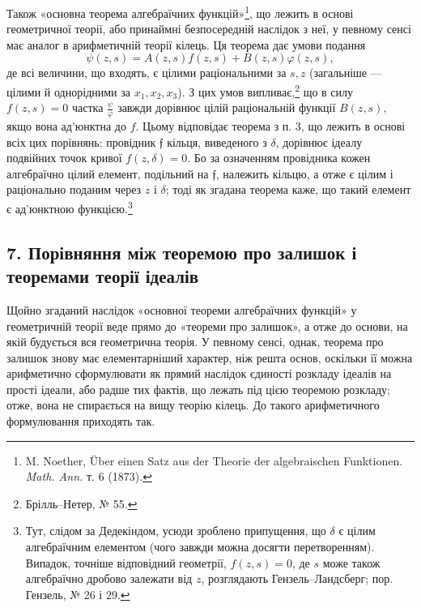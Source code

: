 \documentclass[11pt]{article}
\providecommand{\frf}{\mathfrak f}
\begin{document}
Також «основна теорема алгебраїчних функцій»\footnote{M. Noether, Über einen Satz aus der Theorie der algebraischen Funktionen. \emph{Math. Ann.} т. 6 (1873).}, що лежить в основі геометричної теорії, або принаймні безпосередній наслідок з неї, у певному сенсі має аналог в арифметичній теорії кілець. Ця теорема дає умови подання
\[
\psi(z,s)=A(z,s)f(z,s)+B(z,s)\varphi(z,s),
\]
де всі величини, що входять, є цілими раціональними за \(s,z\) (загальніше --- цілими й однорідними за \(x_1,x_2,x_3\)). З цих умов випливає,\footnote{Брілль--Нетер, № 55.} що в силу \(f(z,s)=0\) частка \(\frac{\psi}{\varphi}\) завжди дорівнює цілій раціональній функції \(B(z,s)\), якщо вона ад'юнктна до \(f\). Цьому відповідає теорема з п. 3, що лежить в основі всіх цих порівнянь: провідник \(\frf\) кільця, виведеного з \(\delta\), дорівнює ідеалу подвійних точок кривої \(f(z,\delta)=0\). Бо за означенням провідника кожен алгебраїчно цілий елемент, подільний на \(\frf\), належить кільцю, а отже є цілим і раціонально поданим через \(z\) і \(\delta\); тоді як згадана теорема каже, що такий елемент є ад'юнктною функцією.\footnote{Тут, слідом за Дедекіндом, усюди зроблено припущення, що \(\delta\) є цілим алгебраїчним елементом (чого завжди можна досягти перетворенням). Випадок, точніше відповідний геометрії, \(f(z,s)=0\), де \(s\) може також алгебраїчно дробово залежати від \(z\), розглядають Гензель--Ландсберг; пор. Гензель, № 26 і 29.}

\subsection*{7. Порівняння між теоремою про залишок і теоремами теорії ідеалів}
Щойно згаданий наслідок «основної теореми алгебраїчних функцій» у геометричній теорії веде прямо до «теореми про залишок», а отже до основи, на якій будується вся геометрична теорія. У певному сенсі, однак, теорема про залишок знову має елементарніший характер, ніж решта основ, оскільки її можна арифметично сформулювати як прямий наслідок єдиності розкладу ідеалів на прості ідеали, або радше тих фактів, що лежать під цією теоремою розкладу; отже, вона не спирається на вищу теорію кілець. До такого арифметичного формулювання приходять так.
\end{document}

